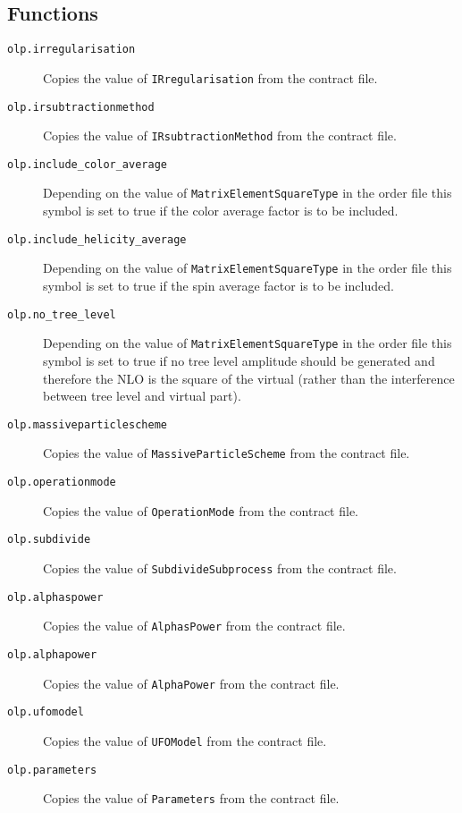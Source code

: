 \documentclass[11pt,a4paper]{refrep}
\begin{document}
\subsection{Functions}
\begin{description}
\item[\texttt{olp.irregularisation}] Copies the value of
   \texttt{IRregularisation} from the contract file.
\item[\texttt{olp.irsubtractionmethod}] Copies the value of
   \texttt{IRsubtractionMethod} from the contract file.
\item[\texttt{olp.include\_color\_average}] Depending on the value of
   \texttt{MatrixElementSquareType} in the order file this symbol
   is set to true if the color average factor is to be included.
\item[\texttt{olp.include\_helicity\_average}] Depending on the value of
   \texttt{MatrixElementSquareType} in the order file this symbol
   is set to true if the spin average factor is to be included.
\item[\texttt{olp.no\_tree\_level}] Depending on the value of
   \texttt{MatrixElementSquareType} in the order file this symbol
   is set to true if no tree level amplitude should be generated and
   therefore the NLO is the square of the virtual (rather than the interference
   between tree level and virtual part).
\item[\texttt{olp.massiveparticlescheme}] Copies the value of
   \texttt{MassiveParticleScheme} from the contract file.
\item[\texttt{olp.operationmode}] Copies the value of
   \texttt{OperationMode} from the contract file.
\item[\texttt{olp.subdivide}] Copies the value of
   \texttt{SubdivideSubprocess} from the contract file.
\item[\texttt{olp.alphaspower}] Copies the value of
   \texttt{AlphasPower} from the contract file.
\item[\texttt{olp.alphapower}] Copies the value of
   \texttt{AlphaPower} from the contract file.
\item[\texttt{olp.ufomodel}] Copies the value of
   \texttt{UFOModel} from the contract file.
\item[\texttt{olp.parameters}] Copies the value of
   \texttt{Parameters} from the contract file.
\end{description}
\end{document}
